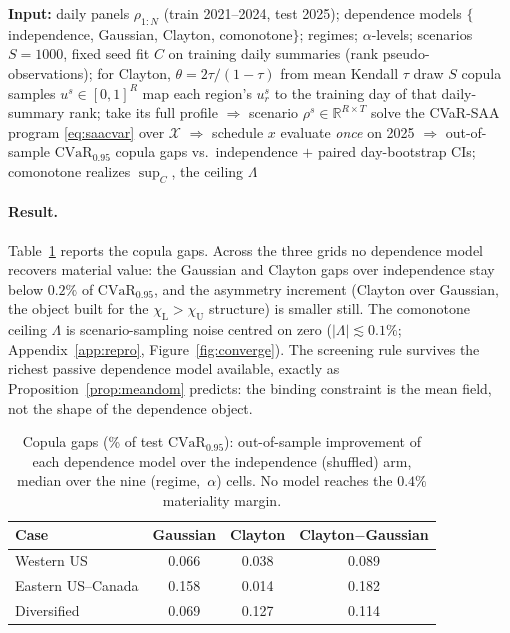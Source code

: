 \documentclass[12pt]{article}
\newcommand{\CVaR}{\mathrm{CVaR}}
\newcommand{\R}{\mathbb{R}}
\newcommand{\chiU}{\chi_{\mathrm{U}}}
\newcommand{\chiL}{\chi_{\mathrm{L}}}
\begin{document}
\begin{algorithm}[h]
\caption{Copula-scenario CVaR scheduling (one region set)}
\label{alg:copula}
\begin{algorithmic}[1]
\State \textbf{Input:} daily panels $\rho_{1:N}$ (train 2021--2024, test 2025);
dependence models $\{$independence, Gaussian, Clayton, comonotone$\}$; regimes;
$\alpha$-levels; scenarios $S=1000$, fixed seed
  \State fit $C$ on training daily summaries (rank pseudo-observations); for Clayton,
  $\theta=2\tau/(1-\tau)$ from mean Kendall $\tau$
    \State draw $S$ copula samples $u^s\in[0,1]^R$ 
    \State map each region's $u^s_r$ to the training day of that daily-summary rank;
    take its full profile $\Rightarrow$ scenario $\rho^s\in\R^{R\times T}$
    \State solve the CVaR-SAA program \eqref{eq:saacvar} over $\mathcal X$
    $\Rightarrow$ schedule $x$
    \State evaluate \emph{once} on 2025 $\Rightarrow$ out-of-sample $\CVaR_{0.95}$
  \EndFor
\EndFor
\State copula gaps vs.\ independence $+$ paired day-bootstrap CIs; comonotone
realizes $\sup_C$, the ceiling $\Lambda$
\end{algorithmic}
\end{algorithm}

\paragraph{Result.} Table~\ref{tab:copula} reports the copula gaps. Across the three
grids no dependence model recovers material value: the Gaussian and Clayton gaps over
independence stay below $0.2\%$ of $\CVaR_{0.95}$, and the asymmetry increment
(Clayton over Gaussian, the object built for the $\chiL>\chiU$ structure) is smaller
still. The comonotone ceiling $\Lambda$ is scenario-sampling noise centred on zero
($|\Lambda|\lesssim0.1\%$; Appendix~\ref{app:repro}, Figure~\ref{fig:converge}). The
screening rule survives the richest passive dependence model available, exactly as
Proposition~\ref{prop:meandom} predicts: the binding constraint is the mean field, not
the shape of the dependence object.

\begin{table}[h]
\centering\small
\caption{Copula gaps (\% of test $\CVaR_{0.95}$): out-of-sample improvement of each
dependence model over the independence (shuffled) arm, median over the nine
(regime,~$\alpha$) cells. No model reaches the $0.4\%$ materiality margin.}
\label{tab:copula}
\begin{tabular}{lccc}
\toprule
Case & Gaussian & Clayton & Clayton$-$Gaussian\\
\midrule
Western US        & 0.066 & 0.038 & 0.089\\
Eastern US--Canada & 0.158 & 0.014 & 0.182\\
Diversified       & 0.069 & 0.127 & 0.114\\
\bottomrule
\end{tabular}
\end{table}
\end{document}
